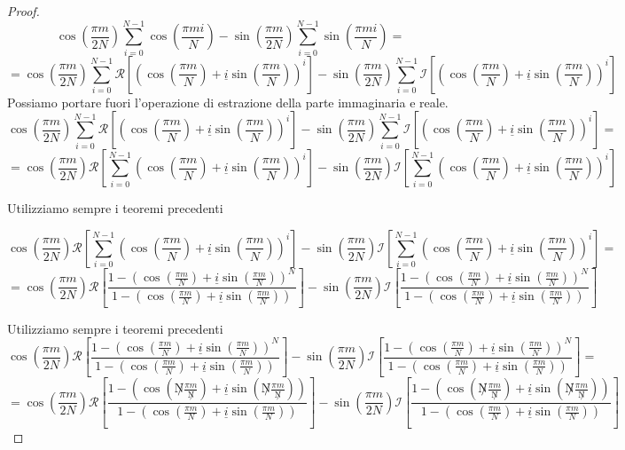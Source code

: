 \begin{teorema}
\begin{proof}
        $$\cos(\frac{\pi m}{2N})\sum_{i=0}^{N-1}  \cos(\frac{\pi m i}{N}) -\sin(\frac{\pi m}{2N})\sum_{i=0}^{N-1}\sin(\frac{\pi m i}{N}) = $$
        $$= \cos(\frac{\pi m}{2N})\sum_{i=0}^{N-1}  \mathcal{R}\left[\left(\cos(\frac{\pi m }{N}) + \underline{i} \sin(\frac{\pi m }{N})\right)^i\right] -\sin(\frac{\pi m}{2N})\sum_{i=0}^{N-1}\mathcal{I}\left[\left(\cos(\frac{\pi m }{N}) + \underline{i} \sin(\frac{\pi m }{N})\right)^i\right]$$
        Possiamo portare fuori l'operazione di estrazione della parte immaginaria
        e reale.
        $$\cos(\frac{\pi m}{2N})\sum_{i=0}^{N-1}  \mathcal{R}\left[\left(\cos(\frac{\pi m }{N}) + \underline{i} \sin(\frac{\pi m }{N})\right)^i\right] -\sin(\frac{\pi m}{2N})\sum_{i=0}^{N-1}\mathcal{I}\left[\left(\cos(\frac{\pi m }{N}) + \underline{i} \sin(\frac{\pi m }{N})\right)^i\right]=$$
        $$=\cos(\frac{\pi m}{2N})\mathcal{R}\left[\sum_{i=0}^{N-1}  \left(\cos(\frac{\pi m }{N}) + \underline{i} \sin(\frac{\pi m }{N})\right)^i\right] -\sin(\frac{\pi m}{2N})\mathcal{I}\left[\sum_{i=0}^{N-1}\left(\cos(\frac{\pi m }{N}) + \underline{i} \sin(\frac{\pi m }{N})\right)^i\right]$$
        
        Utilizziamo sempre i teoremi precedenti
    
        $$\cos(\frac{\pi m}{2N})\mathcal{R}\left[\sum_{i=0}^{N-1}  \left(\cos(\frac{\pi m }{N}) + \underline{i} \sin(\frac{\pi m }{N})\right)^i\right] -\sin(\frac{\pi m}{2N})\mathcal{I}\left[\sum_{i=0}^{N-1}\left(\cos(\frac{\pi m }{N}) + \underline{i} \sin(\frac{\pi m }{N})\right)^i\right]=$$
        $$=\cos(\frac{\pi m}{2N})\mathcal{R}\left[ \frac{1- \left(\cos(\frac{\pi m }{N}) + \underline{i} \sin(\frac{\pi m }{N})\right)^N}{1-\left(\cos(\frac{\pi m }{N}) + \underline{i} \sin(\frac{\pi m }{N})\right)}\right] -\sin(\frac{\pi m}{2N})\mathcal{I}\left[\frac{1- \left(\cos(\frac{\pi m }{N}) + \underline{i} \sin(\frac{\pi m }{N})\right)^N}{1-\left(\cos(\frac{\pi m }{N}) + \underline{i} \sin(\frac{\pi m }{N})\right)}\right]$$
        
        Utilizziamo sempre i teoremi precedenti
        $$\cos(\frac{\pi m}{2N})\mathcal{R}\left[ \frac{1- \left(\cos(\frac{\pi m }{N}) + \underline{i} \sin(\frac{\pi m }{N})\right)^N}{1-\left(\cos(\frac{\pi m }{N}) + \underline{i} \sin(\frac{\pi m }{N})\right)}\right] -\sin(\frac{\pi m}{2N})\mathcal{I}\left[\frac{1- \left(\cos(\frac{\pi m }{N}) + \underline{i} \sin(\frac{\pi m }{N})\right)^N}{1-\left(\cos(\frac{\pi m }{N}) + \underline{i} \sin(\frac{\pi m }{N})\right)}\right]=$$
        $$=\cos(\frac{\pi m}{2N})\mathcal{R}\left[ \frac{1- \left(\cos(\not N\frac{\pi m }{\not N}) + \underline{i} \sin(\not N\frac{\pi m }{\not N})\right)}{1-\left(\cos( \frac{\pi m }{ N}) + \underline{i} \sin( \frac{\pi m }{ N})\right)}\right] -\sin(\frac{\pi m}{2N})\mathcal{I}\left[\frac{1- \left(\cos(\not N\frac{\pi m }{\not N}) + \underline{i} \sin(\not N\frac{\pi m }{\not N})\right)}{1-\left(\cos(\frac{\pi m }{N}) + \underline{i} \sin(\frac{\pi m }{N})\right)}\right]$$
    

\end{proof}
\end{teorema}
